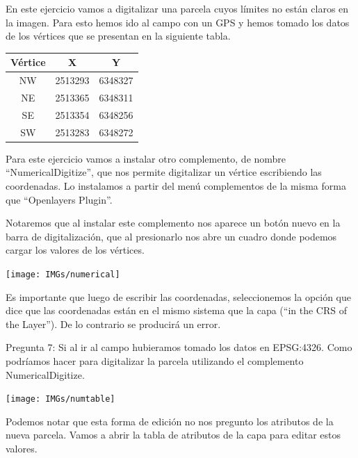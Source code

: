 \documentclass[onecolumn]{article}
\begin{document}
En este ejercicio vamos a digitalizar una parcela cuyos límites no están claros en la imagen. Para esto hemos ido al campo con un GPS y hemos tomado los datos de los vértices que se presentan en la siguiente tabla.


\begin{center}
	\begin{tabular}{|c|c|c|}
	\hline Vértice & X & Y \\ 
	\hline NW & 2513293 & 6348327 \\ 
	\hline NE & 2513365 & 6348311 \\ 
	\hline SE & 2513354 & 6348256 \\ 
	\hline SW & 2513283 & 6348272 \\ 
	\hline 
\end{tabular} 
\end{center}

Para este ejercicio vamos a instalar otro complemento, de nombre “NumericalDigitize”, que nos permite digitalizar un vértice escribiendo las coordenadas. Lo instalamos a partir del menú complementos de la misma forma que “Openlayers Plugin”.

Notaremos que al instalar este complemento nos aparece un botón nuevo en la barra de digitalización, que al presionarlo nos abre un cuadro donde podemos cargar los valores de los vértices. 

\begin{center}
	\texttt{[image: IMGs/numerical]}
\end{center}

Es importante que luego de escribir las coordenadas, seleccionemos la opción que dice que las coordenadas están en el mismo sistema que la capa (“in the CRS of the Layer”). De lo contrario se producirá un error.

\begin{mdframed}[]
	Pregunta 7: Si al ir al campo hubieramos tomado los datos en EPSG:4326. Como podríamos hacer para digitalizar la parcela utilizando el complemento NumericalDigitize.
\end{mdframed}



\begin{center}
	\texttt{[image: IMGs/numtable]}
\end{center}

Podemos notar que esta forma de edición no nos pregunto los atributos de la nueva parcela. Vamos a abrir la tabla de atributos de la capa para editar estos valores.
\end{document}
